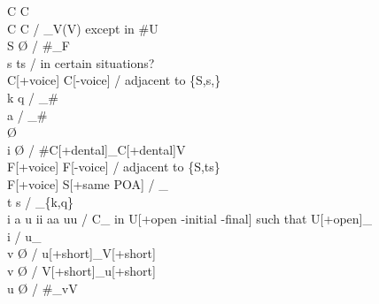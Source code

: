 \documentclass[11pt]{article}
\begin{document}
C\textipa{:} \textrightarrow\hspace{0pt} C \\
C \textrightarrow\hspace{0pt} C\textipa{:} / _V(\textellipsis V) except in \#U \\
S \textrightarrow\hspace{0pt} \O\hspace{0pt} / \#_F \\
s \textrightarrow\hspace{0pt} ts / in certain situations? \\
C[+voice] \textrightarrow\hspace{0pt} C[-voice] / adjacent to \{S,s,\} \\
 \textrightarrow\hspace{0pt} k q / _\# \\
 \textrightarrow\hspace{0pt} a / _\# \\
 \textrightarrow\hspace{0pt} \O\hspace{0pt} \\
i \textrightarrow\hspace{0pt} \O\hspace{0pt} / \#C[+dental]_C[+dental]V \\
F[+voice] \textrightarrow\hspace{0pt} F[-voice] / adjacent to \{S,ts\} \\
F[+voice] \textrightarrow\hspace{0pt} S[+same POA] / _ \\
t \textrightarrow\hspace{0pt} s / _\{k,q\} \\
i a u \textrightarrow\hspace{0pt} ii aa uu / C_ in U[+open -initial -final] such that U[+open]_ \\
 \textrightarrow\hspace{0pt} i / u_ \\
v \textrightarrow\hspace{0pt} \O\hspace{0pt} / u[+short]_V[+short] \\
v \textrightarrow\hspace{0pt} \O\hspace{0pt} / V[+short]_u[+short] \\
u \textrightarrow\hspace{0pt} \O\hspace{0pt} / \#_vV \\
\end{document}
